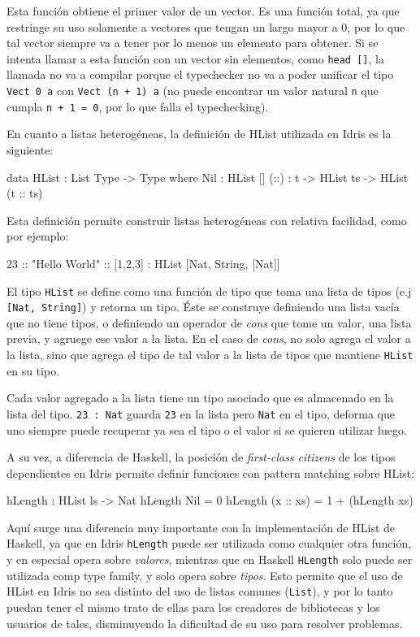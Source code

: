 Esta función obtiene el primer valor de un vector. Es una función total, ya que restringe su uso solamente a vectores que tengan un largo mayor a 0, por lo que tal vector siempre va a tener por lo menos un elemento para obtener. Si se intenta llamar a esta función con un vector sin elementos, como \texttt{head []}, la llamada no va a compilar porque el typechecker no va a poder unificar el tipo \texttt{Vect 0 a} con \texttt{Vect (n + 1) a} (no puede encontrar un valor natural \texttt{n} que cumpla \texttt{n + 1 = 0}, por lo que falla el typechecking).

En cuanto a listas heterogéneas, la definición de HList utilizada en Idris es la siguiente:

\begin{code}
data HList : List Type -> Type where
  Nil : HList []
  (::) : t -> HList ts -> HList (t :: ts)
\end{code}

Esta definición permite construir listas heterogéneas con relativa facilidad, como por ejemplo:

\begin{code}
23 :: "Hello World" :: [1,2,3] :
  HList [Nat, String, [Nat]]
\end{code}

El tipo \texttt{HList} se define como una función de tipo que toma una lista de tipos (e.j \texttt{[Nat, String]}) y retorna un tipo. Éste se construye definiendo una lista vacía que no tiene tipos, o definiendo un operador de \textit{cons} que tome un valor, una lista previa, y agruege ese valor a la lista. En el caso de \textit{cons}, no solo agrega el valor a la lista, sino que agrega el tipo de tal valor a la lista de tipos que mantiene \texttt{HList} en su tipo.

Cada valor agregado a la lista tiene un tipo asociado que es almacenado en la lista del tipo. \texttt{23 : Nat} guarda \texttt{23} en la lista pero \texttt{Nat} en el tipo, deforma que uno siempre puede recuperar ya sea el tipo o el valor si se quieren utilizar luego.

A su vez, a diferencia de Haskell, la posición de \textit{first-class citizens} de los tipos dependientes en Idris permite definir funciones con pattern matching sobre HList:

\begin{code}
hLength : HList ls -> Nat
hLength Nil = 0
hLength (x :: xs) = 1 + (hLength xs)
\end{code}

Aquí surge una diferencia muy importante con la implementación de HList de Haskell, ya que en Idris \texttt{hLength} puede ser utilizada como cualquier otra función, y en especial opera sobre \textit{valores}, mientras que en Haskell \texttt{HLength} solo puede ser utilizada comp type family, y solo opera sobre \textit{tipos}. Esto permite que el uso de HList en Idris no sea distinto del uso de listas comunes (\texttt{List}), y por lo tanto puedan tener el mismo trato de ellas para los creadores de bibliotecas y los usuarios de tales, disminuyendo la dificultad de su uso para resolver problemas.

